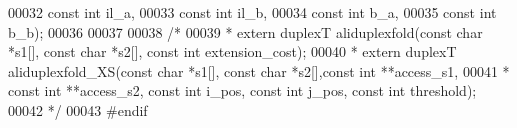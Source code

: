\begin{DoxyCode}
00032                             \textcolor{keyword}{const} \textcolor{keywordtype}{int}   il\_a,
00033                             \textcolor{keyword}{const} \textcolor{keywordtype}{int}   il\_b,
00034                             \textcolor{keyword}{const} \textcolor{keywordtype}{int}   b\_a,
00035                             \textcolor{keyword}{const} \textcolor{keywordtype}{int}   b\_b);
00036 
00037 
00038 \textcolor{comment}{/*}
00039 \textcolor{comment}{ * extern duplexT aliduplexfold(const char *s1[], const char *s2[], const int extension\_cost);}
00040 \textcolor{comment}{ * extern duplexT aliduplexfold\_XS(const char *s1[], const char *s2[],const int **access\_s1,}
00041 \textcolor{comment}{ * const int **access\_s2, const int i\_pos, const int j\_pos, const int threshold);}
00042 \textcolor{comment}{ */}
00043 \textcolor{preprocessor}{#endif}
\end{DoxyCode}
